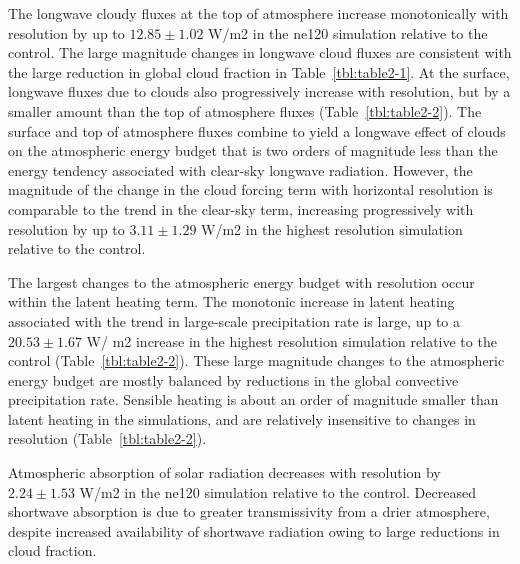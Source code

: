 The longwave cloudy fluxes at the top of atmosphere increase monotonically with resolution by up to $12.85 \pm 1.02$ W/m2 in the ne120 simulation relative to the control. The large magnitude changes in longwave cloud fluxes are consistent with the large reduction in global cloud fraction in Table~\ref{tbl:table2-1}. At the surface, longwave fluxes due to clouds also progressively increase with resolution, but by a smaller amount than the top of atmosphere fluxes (Table~\ref{tbl:table2-2}). The surface and top of atmosphere fluxes combine to yield a longwave effect of clouds on the atmospheric energy budget that is two orders of magnitude less than the energy tendency associated with clear-sky longwave radiation. However, the magnitude of the change in the cloud forcing term with horizontal resolution is comparable to the trend in the clear-sky term, increasing progressively with resolution by up to $3.11 \pm 1.29$ W/m2 in the highest resolution simulation relative to the control.

The largest changes to the atmospheric energy budget with resolution occur within the latent heating term. The monotonic increase in latent heating associated with the trend in large-scale precipitation rate is large, up to a $20.53 \pm 1.67$ W/ m2 increase in the highest resolution simulation relative to the control (Table~\ref{tbl:table2-2}). These large magnitude changes to the atmospheric energy budget are mostly balanced by reductions in the global convective precipitation rate. Sensible heating is about an order of magnitude smaller than latent heating in the simulations, and are relatively insensitive to changes in resolution (Table~\ref{tbl:table2-2}). 

Atmospheric absorption of solar radiation decreases with resolution by $2.24 \pm 1.53$ W/m2 in the ne120 simulation relative to the control. Decreased shortwave absorption is due to greater transmissivity from a drier atmosphere, despite increased availability of shortwave radiation owing to large reductions in cloud fraction. 


